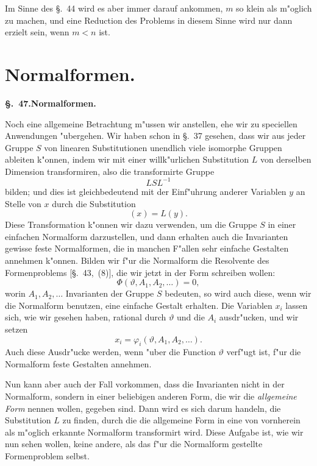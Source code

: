 \documentclass[12pt,a4paper]{article}
\theoremstyle{definition}
\begin{document}
Im Sinne des \S.~44 wird es aber immer darauf ankommen, $m$ so klein als m"oglich zu machen, und eine Reduction des Problems in diesem Sinne wird nur dann erzielt sein, wenn $m < n$ ist.


\section{Normalformen.}\label{sec:47}

\noindent\textbf{\S.~47.}\quad\textbf{Normalformen.}
\vspace{0.3cm}

Noch eine allgemeine Betrachtung m"ussen wir anstellen, ehe wir zu speciellen Anwendungen "ubergehen. Wir haben schon in \S.~37 gesehen, dass wir aus jeder Gruppe $S$ von linearen Substitutionen unendlich viele isomorphe Gruppen ableiten k"onnen, indem wir mit einer willk"urlichen Substitution $L$ von derselben Dimension transformiren, also die transformirte Gruppe
\begin{equation}\label{eq:47-1}
LSL^{-1}
\end{equation}
bilden; und dies ist gleichbedeutend mit der Einf"uhrung anderer Variablen $y$ an Stelle von $x$ durch die Substitution
\begin{equation}\label{eq:47-2}
(x) = L(y).
\end{equation}
Diese Transformation k"onnen wir dazu verwenden, um die Gruppe $S$ in einer einfachen Normalform darzustellen, und dann erhalten auch die Invarianten gewisse feste Normalformen, die in manchen F"allen sehr einfache Gestalten annehmen k"onnen. Bilden wir f"ur die Normalform die Resolvente des Formenproblems [\S.~43,~(8)], die wir jetzt in der Form schreiben wollen:
\begin{equation}\label{eq:47-3}
\Phi(\vartheta, A_1, A_2, \ldots) = 0,
\end{equation}
worin $A_1, A_2, \ldots$ Invarianten der Gruppe $S$ bedeuten, so wird auch diese, wenn wir die Normalform benutzen, eine einfache Gestalt erhalten. Die Variablen $x_i$ lassen sich, wie wir gesehen haben, rational durch $\vartheta$ und die $A_i$ ausdr"ucken, und wir setzen
\begin{equation}\label{eq:47-4}
x_i = \varphi_i(\vartheta, A_1, A_2, \ldots).
\end{equation}
Auch diese Ausdr"ucke werden, wenn "uber die Function $\vartheta$ verf"ugt ist, f"ur die Normalform feste Gestalten annehmen.

Nun kann aber auch der Fall vorkommen, dass die Invarianten nicht in der Normalform, sondern in einer beliebigen anderen Form, die wir die \emph{allgemeine Form} nennen wollen, gegeben sind. Dann wird es sich darum handeln, die Substitution $L$ zu finden, durch die die allgemeine Form in eine von vornherein als m"oglich erkannte Normalform transformirt wird. Diese Aufgabe ist, wie wir nun sehen wollen, keine andere, als das f"ur die Normalform gestellte Formenproblem selbst.
\end{document}
